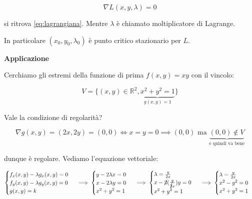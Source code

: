 \documentclass[../appunti-analisi.tex]{subfiles}
\begin{document}
\[
    \nabla L(x,y,\lambda) = 0
\]

si ritrova \ref{eq:lagrangiana}. Mentre $\lambda$ è chiamato moltiplicatore di Lagrange.

In particolare $(x_0,y_0, \lambda_0)$ è punto critico stazionario per $L$.

\newpage

\textbf{Applicazione} 

Cerchiamo gli estremi della funzione di prima $f(x,y) = xy$ con il vincolo:

\[
    V= \{(x,y) \in \mathbb{R}^{2}, \underbrace{x^{2}+y^{2} = 1}_\text{$g(x,y) = 1$}\}
\]

Vale la condizione di regolarità?

\[
    \nabla g(x,y) = (2x,2y) = (0,0) \Leftrightarrow x=y=0 \implies (0,0) \text{ ma } \underbrace{(0,0) \notin V}_\text{e quindi va bene}
\]

dunque è regolare. Vediamo l'equazione vettoriale:

\[
        \begin{cases}
               f_x(x,y) - \lambda g_x(x,y) = 0\\
               f_y(x,y) - \lambda g_y(x,y) = 0\\
               g(x,y) = k
        \end{cases}\, \implies
        \begin{cases}
               y -2 \lambda x= 0\\
               x -2 \lambda y = 0\\
               x^{2}+ y^{2}= 1
        \end{cases}\, \implies
        \begin{cases}
               \lambda= \frac{y}{2x}\\
               x-\cancel{2}( \frac{y}{\cancel{2}x})y= 0\\
               x^{2}+ y^{2}= 1
        \end{cases}\, \implies
        \begin{cases}
               \lambda= \frac{y}{2x}\\
               x^{2}-y^{2}= 0\\
               x^{2}+ y^{2}= 1
        \end{cases}\, 
\]
\end{document}
